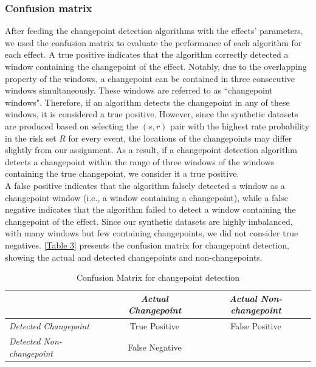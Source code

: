 \documentclass[]{interact}
\theoremstyle{plain}%
\theoremstyle{definition}
\theoremstyle{remark}
\begin{document}
	\subsubsection{Confusion matrix} \label{sec:confusion matrix}
	
	\hspace{0.28cm} After feeding the changepoint detection algorithms with the effects' parameters, we used the confusion matrix to evaluate the performance of each algorithm for each effect. A true positive indicates that the algorithm correctly detected a window containing the changepoint of the effect. Notably, due to the overlapping property of the windows, a changepoint can be contained in three consecutive windows simultaneously. These windows are referred to as ``changepoint windows". Therefore, if an algorithm detects the changepoint in any of these windows, it is considered a true positive. However, since the synthetic datasets are produced based on selecting the $(s,r)$ pair with the highest rate probability in the risk set $R$ for every event, the locations of the changepoints may differ slightly from our assignment. As a result, if a changepoint detection algorithm detects a changepoint within the range of three windows of the windows containing the true changepoint, we consider it a true positive. \\
	
	A false positive indicates that the algorithm falsely detected a window as a changepoint window (i.e., a window containing a changepoint), while a false negative indicates that the algorithm failed to detect a window containing the changepoint of the effect. Since our synthetic datasets are highly imbalanced, with many windows but few containing changepoints, we did not consider true negatives. \autoref{Table 3} presents the confusion matrix for changepoint detection, showing the actual and detected changepoints and non-changepoints.
	
	\begin{table}[H]
	\centering
	\renewcommand{\arraystretch}{1.5} %
	\small
	\caption{Confusion Matrix for changepoint detection}
	\begin{tabular}{l|c|c}
		\hline
		& \textit{Actual Changepoint} & \textit{Actual Non-changepoint}                   \\ \hline
		\textit{Detected Changepoint} & True Positive              & False Positive                               \\ \hline
		\textit{Detected Non-changepoint} & False Negative             & \multicolumn{1}{l}{\cellcolor[HTML]{C0C0C0}} \\ \hline
	\end{tabular}
	\label{Table 3}
    \end{table}
	
\end{document}

